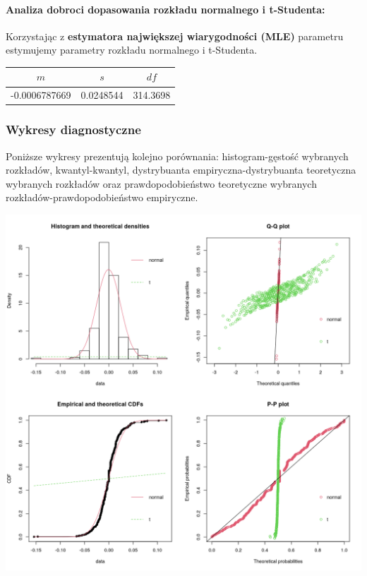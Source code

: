 \documentclass[a4paper,11pt]{article}
\begin{document}
\paragraph{Analiza dobroci dopasowania rozkładu normalnego i t-Studenta:}
Korzystając z \textbf{estymatora największej wiarygodności (MLE)} parametru estymujemy parametry rozkładu normalnego i t-Studenta.

\begin{center}
\begin{tabular}{|c|c|c|}
    \hline
    $m$ & $s$ & $df$ \\ \hline
    -0.0006787669 & 0.0248544 & 314.3698 \\ \hline
\end{tabular}
\end{center}

\newpage
\subsubsection{Wykresy diagnostyczne}
Poniższe wykresy prezentują kolejno porównania: histogram-gęstość wybranych rozkładów, kwantyl-kwantyl, dystrybuanta empiryczna-dystrybuanta teoretyczna wybranych rozkładów oraz prawdopodobieństwo teoretyczne wybranych rozkładów-prawdopodobieństwo empiryczne.

\centerline{\includegraphics[width=1\textwidth]{./Kajtek/img/diagnostical-plots.png}}
\end{document}
